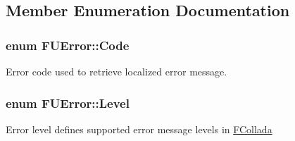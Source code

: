 \subsection{Member Enumeration Documentation}
\hypertarget{classFUError_adb409c35dc05786e6742818fc7643d7d}{
\subsubsection[{Code}]{\setlength{\rightskip}{0pt plus 5cm}enum {\bf FUError::Code}}}
\label{classFUError_adb409c35dc05786e6742818fc7643d7d}
Error code used to retrieve localized error message. \hypertarget{classFUError_ac4b066f99c221e180ecfe9183fabbf3c}{
\subsubsection[{Level}]{\setlength{\rightskip}{0pt plus 5cm}enum {\bf FUError::Level}}}
\label{classFUError_ac4b066f99c221e180ecfe9183fabbf3c}
Error level defines supported error message levels in \hyperlink{namespaceFCollada}{FCollada} 

